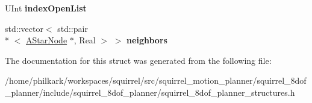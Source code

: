 \begin{DoxyCompactItemize}
\item 
\hypertarget{structSquirrelMotionPlanner_1_1AStarNode_af67766b5a7a72c78998d2e9cc9b3463b}{U\-Int {\bfseries index\-Open\-List}}\label{structSquirrelMotionPlanner_1_1AStarNode_af67766b5a7a72c78998d2e9cc9b3463b}

\item 
\hypertarget{structSquirrelMotionPlanner_1_1AStarNode_ac9e33f9c9b04f8f8ed82a21c783758ae}{std\-::vector$<$ std\-::pair\\*
$<$ \hyperlink{structSquirrelMotionPlanner_1_1AStarNode}{A\-Star\-Node} $\ast$, Real $>$ $>$ {\bfseries neighbors}}\label{structSquirrelMotionPlanner_1_1AStarNode_ac9e33f9c9b04f8f8ed82a21c783758ae}

\end{DoxyCompactItemize}


The documentation for this struct was generated from the following file\-:\begin{DoxyCompactItemize}
\item 
/home/philkark/workspaces/squirrel/src/squirrel\-\_\-motion\-\_\-planner/squirrel\-\_\-8dof\-\_\-planner/include/squirrel\-\_\-8dof\-\_\-planner/squirrel\-\_\-8dof\-\_\-planner\-\_\-structures.\-h\end{DoxyCompactItemize}
